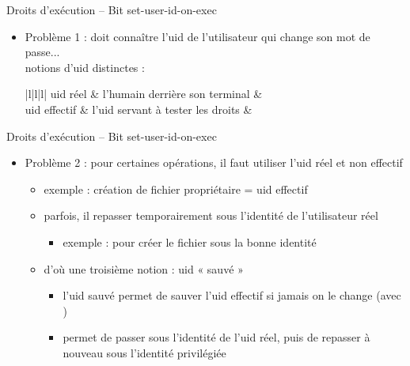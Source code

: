 \begin {frame} {Droits d'exécution -- Bit set-user-id-on-exec}

    \begin {itemize}
	\item Problème 1 :  doit connaître l'uid de
	    l'utilisateur qui change son mot de passe...
	    \\
	     notions d'uid distinctes :

	    \vspace* {-2mm}

	    \ctableau {\fC} {|l|l|l|} {
		\rca uid réel
		    & l'humain derrière son terminal
		    & 
		    \\
		\rcb uid effectif
		    & l'uid servant à tester les droits
		    & 
		    \\
	    }
    \end {itemize}
\end {frame}

\begin {frame} {Droits d'exécution -- Bit set-user-id-on-exec}
    \begin {itemize}
	\item Problème 2 : pour certaines opérations, il faut utiliser
	    l'uid réel et non effectif
	    \begin {itemize}
		\item exemple : création de fichier
		    \implique propriétaire = uid effectif
		\item parfois, il repasser temporairement sous l'identité
		    de l'utilisateur réel
		    \begin {itemize} 
			\item exemple : pour créer le fichier sous la bonne identité
		    \end {itemize}

		\item d'où une troisième notion : uid « sauvé »
		    \begin {itemize}
			\item l'uid sauvé permet de sauver l'uid effectif
			    si jamais on le change (avec
			    )
			\item permet de passer sous l'identité de
			    l'uid réel, puis de repasser à nouveau
			    sous l'identité privilégiée
		    \end {itemize}
	    \end {itemize}
    \end {itemize}
\end {frame}

